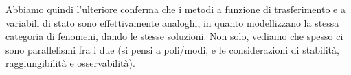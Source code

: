 \documentclass[a4paper,11pt]{article}
\begin{document}
Abbiamo quindi l'ulteriore conferma che i metodi a funzione di trasferimento e a variabili di stato sono effettivamente analoghi, in quanto modellizzano la stessa categoria di fenomeni, dando le stesse soluzioni.
Non solo, vediamo che spesso ci sono parallelismi fra i due (si pensi a poli/modi, e le considerazioni di stabilità, raggiungibilità e osservabilità).
\end{document}
